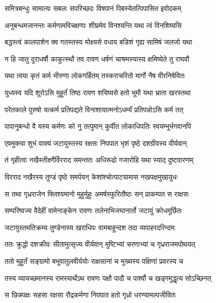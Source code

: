 \twolineshloka
{समित्रबन्धुः सामात्यः सबलः सपरिच्छदः}
{विषपानं पिबस्येतत्पिपासित इवोदकम्} %

\twolineshloka
{अनुबन्धमजानन्तः कर्मणामविचक्षणाः}
{शीघ्रमेव विनश्यन्ति यथा त्वं विनशिष्यसि} %

\twolineshloka
{बद्धस्त्वं कालपाशेन क्व गतस्तस्य मोक्ष्यसे}
{वधाय बडिशं गृह्य सामिषं जलजो यथा} %

\twolineshloka
{न हि जातु दुराधर्षौ काकुत्स्थौ तव रावण}
{धर्षणं चाश्रमस्यास्य क्षमिष्येते तु राघवौ} %

\twolineshloka
{यथा त्वया कृतं कर्म भीरुणा लोकगर्हितम्}
{तस्कराचरितो मार्गो नैष वीरनिषेवितः} %

\twolineshloka
{युध्यस्व यदि शूरोऽसि मुहूर्तं तिष्ठ रावण}
{शयिष्यसे हतो भूमौ यथा भ्राता खरस्तथा} %

\twolineshloka
{परेतकाले पुरुषो यत्कर्म प्रतिपद्यते}
{विनाशायात्मनोऽधर्म्यं प्रतिपन्नोऽसि कर्म तत्} %

\twolineshloka
{पापानुबन्धो वै यस्य कर्मणः को नु तत्पुमान्}
{कुर्वीत लोकाधिपतिः स्वयम्भूर्भगवानपि} %

\twolineshloka
{एवमुक्त्वा शुभं वाक्यं जटायुस्तस्य रक्षसः}
{निपपात भृशं पृष्ठे दशग्रीवस्य वीर्यवान्} %

\twolineshloka
{तं गृहीत्वा नखैस्तीक्ष्णैर्विरराद समन्ततः}
{अधिरूढो गजारोहि यथा स्याद् दुष्टवारणम्} %

\twolineshloka
{विरराद नखैरस्य तुण्डं पृष्ठे समर्पयन्}
{केशांश्चोत्पाटयामास नखपक्षमुखायुधः} %

\twolineshloka
{स तथा गृध्रराजेन क्लिश्यमानो मुहुर्मुहुः}
{अमर्षस्फुरितौष्ठः सन् प्राकम्पत स राक्षसः} %

\twolineshloka
{सम्परिष्वज्य वैदेहीं वामेनाङ्केन रावणः}
{तलेनाभिजघानार्तो जटायुं क्रोधमूर्छितः} %

\twolineshloka
{जटायुस्तमतिक्रम्य तुण्डेनास्य खराधिपः}
{वामबाहून्दश तदा व्यपाहरदरिन्दमः} %

\twolineshloka
{ततः क्रुद्धो दशक्रीवः सीतामुत्सृज्य वीर्यवान्}
{मुष्टिभ्यां चरणाभ्यां च गृध्रराजमपोथयत्} %

\twolineshloka
{ततो मुहूर्तं सङ्ग्रामो बभूवातुलवीर्ययोः}
{राक्षसानां च मुख्यस्य पक्षिणां प्रवरस्य च} %

\twolineshloka
{तस्य व्यायच्छमानस्य रामस्यार्थेऽथ रावणः}
{पक्षौ पादौ च पार्श्वौ च खड्गमुद्धृत्य सोऽच्छिनत्} %

\twolineshloka
{स छिन्नपक्षः सहसा रक्षसा रौद्रकर्मणा}
{निपपात हतो गृध्रो धरण्यामल्पजीवितः} %

